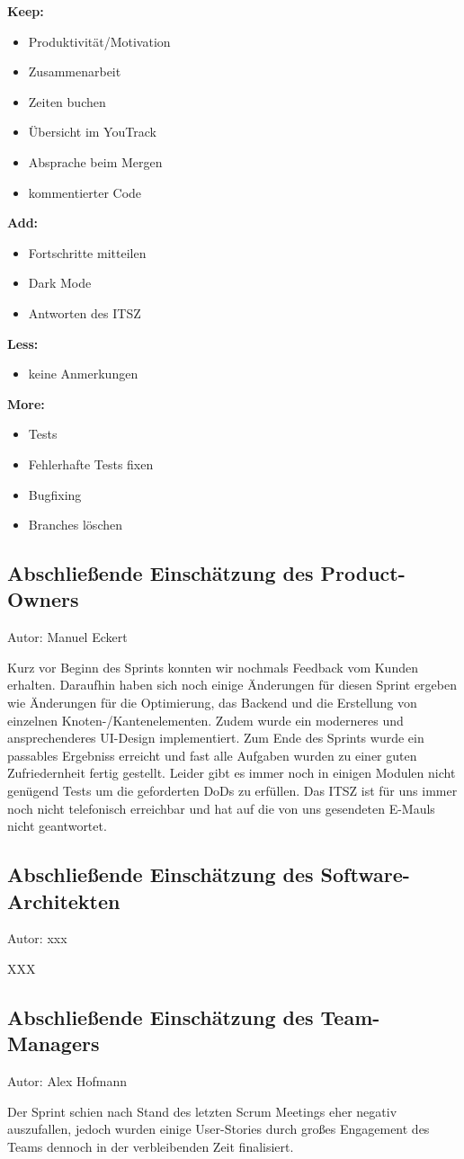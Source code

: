 \textbf{Keep:}
\begin{itemize}
\item Produktivität/Motivation
\item Zusammenarbeit 
\item Zeiten buchen
\item Übersicht im YouTrack
\item Absprache beim Mergen
\item kommentierter Code
\end{itemize}

\textbf{Add:}
\begin{itemize}
\item Fortschritte mitteilen
\item Dark Mode
\item Antworten des ITSZ
\end{itemize}

\textbf{Less:}
\begin{itemize}
\item keine Anmerkungen
\end{itemize}

\textbf{More:}
\begin{itemize}
\item Tests
\item Fehlerhafte Tests fixen
\item Bugfixing
\item Branches löschen
\end{itemize}


\subsection{Abschließende Einschätzung des Product-Owners}
{\small Autor: Manuel Eckert}

Kurz vor Beginn des Sprints konnten wir nochmals Feedback vom Kunden erhalten. Daraufhin haben sich noch einige Änderungen für diesen Sprint ergeben wie Änderungen für die Optimierung, das Backend und die Erstellung von einzelnen Knoten-/Kantenelementen. Zudem wurde ein moderneres und ansprechenderes UI-Design implementiert.
Zum Ende des Sprints wurde ein passables Ergebniss erreicht und fast alle Aufgaben wurden zu einer guten Zufriedernheit fertig gestellt. 
Leider gibt es immer noch in einigen Modulen nicht genügend Tests um die geforderten DoDs zu erfüllen. 
Das ITSZ ist für uns immer noch nicht telefonisch erreichbar und hat auf die von uns gesendeten E-Mauls nicht geantwortet. 

\subsection{Abschließende Einschätzung des Software-Architekten}
{\small Autor: xxx}

XXX

\subsection{Abschließende Einschätzung des Team-Managers}
{\small Autor: Alex Hofmann}

Der Sprint schien nach Stand des letzten Scrum Meetings eher negativ auszufallen, jedoch wurden einige User-Stories durch großes Engagement des Teams dennoch in der verbleibenden Zeit finalisiert.


